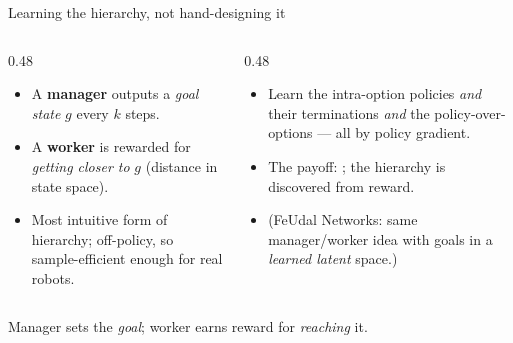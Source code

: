 \begin{frame}{Learning the hierarchy, not hand-designing it}
\begin{columns}[t]
\begin{column}{0.48\textwidth}
\begin{tcolorbox}[colback=mlgreen!20, colframe=mlgreen!60!black,
      title=\textbf{HIRO} --- goals \emph{are} states]
\footnotesize
\begin{itemize}\itemsep0.3em
    \item A \textbf{manager} outputs a \emph{goal state} $g$ every $k$ steps.
    \item A \textbf{worker} is rewarded for \emph{getting closer to} $g$
          (distance in state space).
    \item Most intuitive form of hierarchy; off-policy, so sample-efficient enough for
          real robots.
\end{itemize}
\end{tcolorbox}
\end{column}
\begin{column}{0.48\textwidth}
\begin{tcolorbox}[colback=sysblue!15, colframe=sysblue!70!black,
      title=\textbf{Option-Critic} --- learn options end-to-end]
\footnotesize
\begin{itemize}\itemsep0.3em
    \item Learn the intra-option policies \emph{and} their terminations \emph{and} the
          policy-over-options --- all by policy gradient.
    \item The payoff: ; the hierarchy is discovered from
          reward.
    \item (FeUdal Networks: same manager/worker idea with goals in a \emph{learned latent}
          space.)
\end{itemize}
\end{tcolorbox}
\end{column}
\end{columns}
\vfill
\begin{center}\footnotesize
Manager sets the \emph{goal}; worker earns reward for \emph{reaching} it.
\end{center}
\end{frame}

